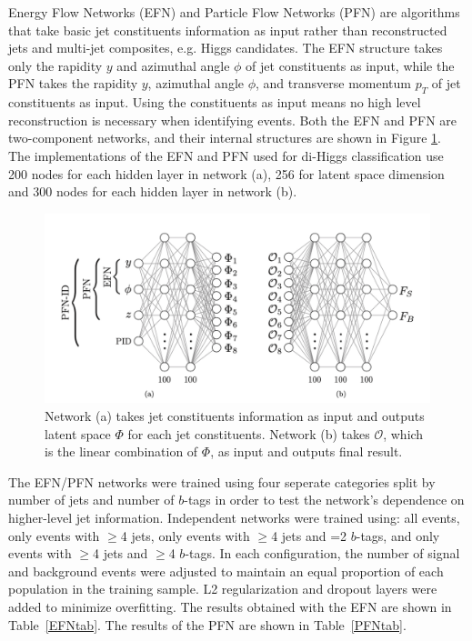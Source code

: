 \label{sec:EFN}
Energy Flow Networks (EFN) and Particle Flow Networks (PFN) are algorithms that take basic jet constituents information as input rather than reconstructed jets and multi-jet composites, e.g. Higgs candidates. The EFN structure takes only the rapidity ${y}$ and azimuthal angle ${\phi}$ of jet constituents as input, while the PFN takes the rapidity $y$, azimuthal angle $\phi$, and transverse momentum $p_{T}$ of jet constituents as input. Using the constituents as input means no high level reconstruction is necessary when identifying events. Both the EFN and PFN are two-component networks, and their internal structures are shown in Figure \ref{fig:EFNArch}. The implementations of the EFN and PFN used for di-Higgs classification use 200 nodes for each hidden layer in network (a), 256 for latent space dimension and 300 nodes for each hidden layer in network (b). 

\begin{figure}[ht!]
\centering
\includegraphics[scale=0.5]{./EFN/EFNArch.png}
\caption{Network (a) takes jet constituents information as input and outputs latent space $\Phi$ for each jet constituents. Network (b) takes $\mathcal{O}$, which is the linear combination of $\Phi$, as input and outputs final result.}
\label{fig:EFNArch}
\end{figure}

The EFN/PFN networks were trained using four seperate categories split by number of jets and number of $b$-tags in order to test the network's dependence on higher-level jet information. Independent networks were trained using: all events, only events with $\geq$4 jets, only events with $\geq$4 jets and =2 $b$-tags, and only events with $\geq$4 jets and $\geq$4 $b$-tags. In each configuration, the number of signal and background events were adjusted to maintain an equal proportion of each population in the training sample. L2 regularization and dropout layers were added to minimize overfitting. The results obtained with the EFN are shown in Table~\ref{EFNtab}. The results of the PFN are shown in Table~\ref{PFNtab}.

